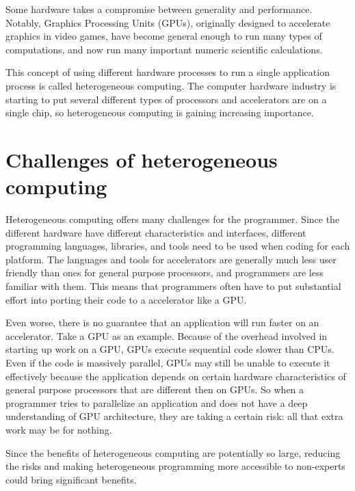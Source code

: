 \documentclass[12pt,twoside]{reedthesis}
\begin{document}
		Some hardware takes a compromise between generality and performance. Notably, Graphics Processing Units (GPUs), originally designed to accelerate graphics in video games, have become general enough to run many types of computations, and now run many important numeric scientific calculations. 
		
		This concept of using different hardware processes to run a single application process is called heterogeneous computing. 
		The computer hardware industry is starting to put several different types of processors and accelerators are on a single chip, so heterogeneous computing is gaining increasing importance.
		
		
	\section{Challenges of heterogeneous computing}
	
		Heterogeneous computing offers many challenges for the programmer. Since the different hardware have different characteristics and interfaces, different programming languages, libraries, and tools need to be used when coding for each platform. The languages and tools for accelerators are generally much less user friendly than ones for general purpose processors, and programmers are less familiar with them. %
		This means that programmers often have to put substantial effort into porting their code to a accelerator like a GPU.
		
		Even worse, there is no guarantee that an application will run faster on an accelerator. Take a GPU as an example. Because of the overhead involved in starting up work on a GPU, GPUs execute sequential code slower than CPUs. Even if the code is massively parallel, GPUs may still be unable to execute it effectively because the application depends on certain hardware characteristics of general purpose processors that are different then on GPUs. %
		So when a programmer tries to parallelize an application and does not have a deep understanding of GPU architecture, they are taking a certain risk: all that extra work may be for nothing. 
		
		Since the benefits of heterogeneous computing are potentially so large, reducing the risks and making heterogeneous programming more accessible to non-experts could bring significant benefits.
		
\end{document}
